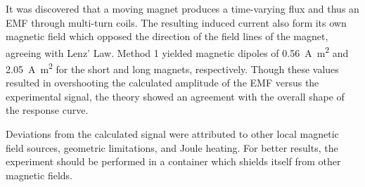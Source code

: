 
It was discovered that a moving magnet produces a time-varying flux and thus an EMF through
multi-turn
coils.
The resulting induced current also form its own magnetic field which opposed the direction of the field lines of the
magnet, agreeing with Lenz' Law.
Method 1 yielded magnetic dipoles of \qty{0.56}{\ampere\meter^2} and \qty{2.05}{\ampere\meter^2} for the short and
long magnets,
respectively.
Though these values resulted in overshooting the calculated amplitude of the EMF versus the experimental signal, the
theory showed an agreement with the overall shape of the response curve.

Deviations from the calculated signal were attributed to other local magnetic field sources, geometric limitations, and
Joule heating.
For better results, the experiment should be performed in a container which shields itself from other magnetic fields.